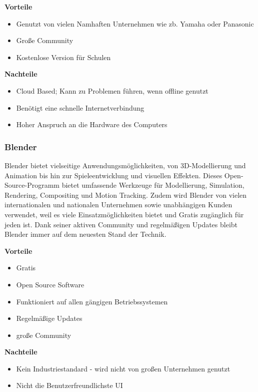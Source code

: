 \textbf{Vorteile}
\begin{itemize}
	\item Genutzt von vielen Namhaften Unternehmen wie zb. Yamaha oder Panasonic
	\item Große Community
	\item Kostenlose Version für Schulen
\end{itemize} 

\textbf{Nachteile}
\begin{itemize}
	\item Cloud Based; Kann zu Problemen führen, wenn offline genutzt 
	\item Benötigt eine schnelle Internetverbindung
	\item Hoher Anspruch an die Hardware des Computers \cite{AutodeskFusionReviews}
	\end{itemize}



\subsubsection{Blender} 
Blender bietet vielseitige Anwendungsmöglichkeiten, von 3D-Modellierung und Animation bis hin zur Spieleentwicklung und visuellen Effekten. Dieses Open-Source-Programm bietet umfassende Werkzeuge für Modellierung, Simulation, Rendering, Compositing und Motion Tracking. Zudem wird Blender von vielen internationalen und nationalen Unternehmen sowie unabhängigen Kunden verwendet, weil es viele Einsatzmöglichkeiten bietet und Gratis zugänglich für jeden ist. Dank seiner aktiven Community und regelmäßigen Updates bleibt Blender immer auf dem neuesten Stand der Technik. \cite{Blender}

\textbf{Vorteile}
\begin{itemize}
	\item Gratis 
	\item Open Source Software
	\item Funktioniert auf allen gängigen Betriebssystemen
	\item Regelmäßige Updates
	\item große Community
\end{itemize}

\textbf{Nachteile}
\begin{itemize}
	\item Kein Industriestandard - wird nicht von großen Unternehmen genutzt
	\item Nicht die Benutzerfreundlichste UI \cite{BlenderPros&Cons}
\end{itemize}

